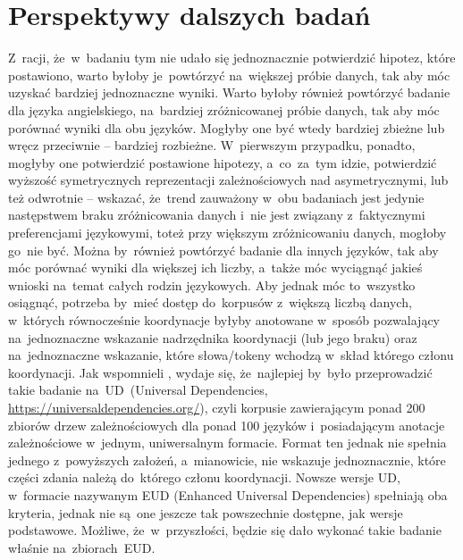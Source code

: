 \documentclass[licencjacka]{pracamgr_Kogni}
\begin{document}
    \section{Perspektywy dalszych badań}\label{sec:perspektywy-dalszych-badan}
   Z~racji, że~w~badaniu tym nie udało się jednoznacznie potwierdzić hipotez, które postawiono, warto byłoby je~powtórzyć na~większej próbie danych, tak aby móc uzyskać bardziej jednoznaczne wyniki.
    Warto byłoby również powtórzyć badanie dla języka angielskiego, na~bardziej zróżnicowanej próbie danych, tak aby móc porównać wyniki dla obu języków.
    Mogłyby one być wtedy bardziej zbieżne lub wręcz przeciwnie -- bardziej rozbieżne.
    W~pierwszym przypadku, ponadto, mogłyby one potwierdzić postawione hipotezy, a~co~za~tym idzie, potwierdzić wyższość symetrycznych reprezentacji zależnościowych nad asymetrycznymi, lub też odwrotnie -- wskazać, że~trend zauważony w~obu badaniach jest jedynie następstwem braku zróżnicowania danych i~nie jest związany z~faktycznymi preferencjami językowymi, toteż przy większym zróżnicowaniu danych, mogłoby go~nie być.
    Można by~również powtórzyć badanie dla innych języków, tak aby móc porównać wyniki dla większej ich liczby, a~także móc wyciągnąć jakieś wnioski na~temat całych rodzin językowych.
    Aby jednak móc to~wszystko osiągnąć, potrzeba by~mieć dostęp do~korpusów z~większą liczbą danych, w~których równocześnie koordynacje byłyby anotowane w~sposób pozwalający na~jednoznaczne wskazanie nadrzędnika koordynacji (lub jego braku) oraz na~jednoznaczne wskazanie, które słowa/tokeny wchodzą w~skład którego członu koordynacji.
    Jak wspomnieli \citet{Przepiorkowski2023}, wydaje się, że~najlepiej by~było przeprowadzić takie badanie na~UD~(Universal Dependencies, \url{https://universaldependencies.org/}), czyli korpusie zawierającym ponad 200 zbiorów drzew zależnościowych dla ponad 100 języków i~posiadającym anotacje zależnościowe w~jednym, uniwersalnym formacie.
    Format ten jednak nie spełnia jednego z~powyższych założeń, a~mianowicie, nie wskazuje jednoznacznie, które części zdania należą do~którego członu koordynacji.
    Nowsze wersje UD, w~formacie nazywanym EUD (Enhanced Universal Dependencies) spełniają oba kryteria, jednak nie są~one jeszcze tak powszechnie dostępne, jak wersje podstawowe.
    Możliwe, że~w~przyszłości, będzie się dało wykonać takie badanie właśnie na~zbiorach~EUD.
\end{document}
